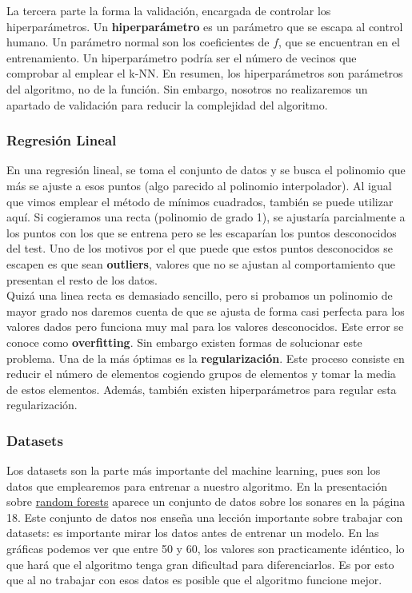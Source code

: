 \documentclass[11pt]{article}
\theoremstyle{plain}
\begin{document}
                La tercera parte la forma la validación, encargada de controlar los hiperparámetros. Un \textbf{hiperparámetro} es un parámetro que se escapa al    control humano. Un parámetro normal son los coeficientes de $f$, que se encuentran en el entrenamiento. Un hiperparámetro podría ser el número de    vecinos que comprobar al emplear el k-NN. En resumen, los hiperparámetros son parámetros del algoritmo, no de la función. Sin embargo, nosotros no   realizaremos un apartado de validación para reducir la complejidad del algoritmo.

            \subsubsection{Regresión Lineal} %
            \label{subsub:regresión_lineal}
                 En una regresión lineal, se toma el conjunto de datos y se busca el polinomio que más se ajuste a esos puntos (algo parecido al polinomio interpolador). Al igual que vimos emplear el método de mínimos cuadrados, también se puede utilizar aquí. Si cogieramos una recta (polinomio de grado 1), se ajustaría parcialmente a los puntos con los que se entrena pero se les escaparían los puntos desconocidos del test. Uno de los motivos por el que puede que estos puntos desconocidos se escapen es que sean \textbf{outliers}, valores que no se ajustan al comportamiento que presentan el resto de los datos.\\

                 Quizá una linea recta es demasiado sencillo, pero si probamos un polinomio de mayor grado nos daremos cuenta de que se ajusta de forma casi perfecta para los valores dados pero funciona muy mal para los valores desconocidos. Este error se conoce como \textbf{overfitting}. Sin embargo existen formas de solucionar este problema. Una de la más óptimas es la \textbf{regularización}. Este proceso consiste en reducir el número de elementos cogiendo grupos de elementos y tomar la media de estos elementos. Además, también existen hiperparámetros para regular esta regularización.
            \subsubsection{Datasets} %
            \label{subsub:datasets}
                Los datasets son la parte más importante del machine learning, pues son los datos que emplearemos para entrenar a nuestro algoritmo. En la presentación sobre \href{https://e-aules.uab.cat/2022-23/pluginfile.php/644137/course/section/76903/introduction_random_forests.pdf?time=1677161999564}{random forests} aparece un conjunto de datos sobre los sonares en la página 18. Este conjunto de datos nos enseña una lección importante sobre trabajar con datasets: es importante mirar los datos antes de entrenar un modelo. En las gráficas podemos ver que entre 50 y 60, los valores son practicamente idéntico, lo que hará que el algoritmo tenga gran dificultad para diferenciarlos. Es por esto que al no trabajar con esos datos es posible que el algoritmo funcione mejor.
\end{document}
